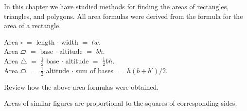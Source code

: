 \documentclass[11pt]{book}
\newcommand{\Xrect}{\ensuremath{\square}}
\newcommand{\Xpgram}{\mathord{\tikz[baseline=-0.05ex,line width=0.5pt]{%
  \draw (0,0) -- (1.35ex,0) -- (1.75ex,1.05ex) -- (0.40ex,1.05ex) -- cycle;}}}
\newcommand{\Xtrap}{\mathord{\tikz[baseline=-0.05ex,line width=0.5pt]{%
  \draw (0,0) -- (1.85ex,0) -- (1.45ex,1.05ex) -- (0.42ex,1.05ex) -- cycle;}}}
\begin{document}
\begin{exlist}
\item In this chapter we have studied methods for finding the areas of
  rectangles, triangles, and polygons. All area formulas were derived from the
  formula for the area of a rectangle.
  \begin{flushleft}
  Area $\Xrect$ $=$ length $\cdot$ width $=$ $lw$.\\
  Area $\Xpgram$ $=$ base $\cdot$ altitude $=$ $bh$.\\
  Area $\triangle$ $=$ $\frac{1}{2}$ base $\cdot$ altitude $=$
    $\frac{1}{2}bh$.\\
  Area $\Xtrap$ $=$ $\frac{1}{2}$ altitude $\cdot$ sum of bases $=$
    $h(b + b')/2$.
  \end{flushleft}
\item Review how the above area formulas were obtained.
\item Areas of similar figures are proportional to the squares of corresponding
  sides.
\end{exlist}
\end{document}
